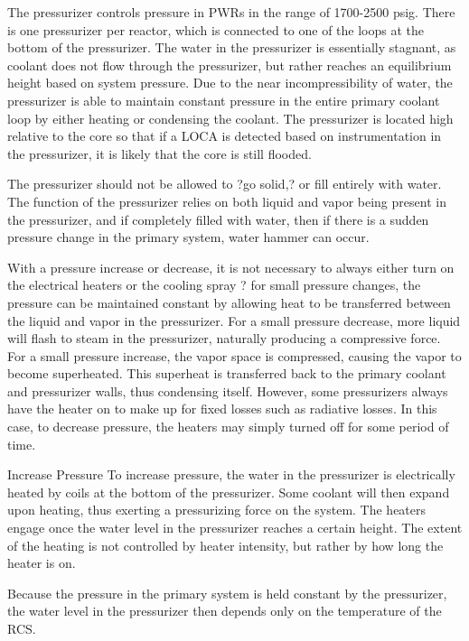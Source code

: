 \documentclass[10pt]{article}
\begin{document}
The pressurizer controls pressure in PWRs in the range of 1700-2500 psig. There is one pressurizer per reactor, which is connected to one of the loops at the bottom of the pressurizer. The water in the pressurizer is essentially stagnant, as coolant does not flow through the pressurizer, but rather reaches an equilibrium height based on system pressure. Due to the near incompressibility of water, the pressurizer is able to maintain constant pressure in the entire primary coolant loop by either heating or condensing the coolant. The pressurizer is located high relative to the core so that if a LOCA is detected based on instrumentation in the pressurizer, it is likely that the core is still flooded.

The pressurizer should not be allowed to ?go solid,? or fill entirely with water. The function of the pressurizer relies on both liquid and vapor being present in the pressurizer, and if completely filled with water, then if there is a sudden pressure change in the primary system, water hammer can occur. 

With a pressure increase or decrease, it is not necessary to always either turn on the electrical heaters or the cooling spray ? for small pressure changes, the pressure can be maintained constant by allowing heat to be transferred between the liquid and vapor in the pressurizer. For a small pressure decrease, more liquid will flash to steam in the pressurizer, naturally producing a compressive force. For a small pressure increase, the vapor space is compressed, causing the vapor to become superheated. This superheat is transferred back to the primary coolant and pressurizer walls, thus condensing itself. However, some pressurizers always have the heater on to make up for fixed losses such as radiative losses. In this case, to decrease pressure, the heaters may simply turned off for some period of time. 

Increase Pressure
To increase pressure, the water in the pressurizer is electrically heated by coils at the bottom of the pressurizer. Some coolant will then expand upon heating, thus exerting a pressurizing force on the system. The heaters engage once the water level in the pressurizer reaches a certain height. The extent of the heating is not controlled by heater intensity, but rather by how long the heater is on. 

Because the pressure in the primary system is held constant by the pressurizer, the water level in the pressurizer then depends only on the temperature of the RCS.  
\end{document}
